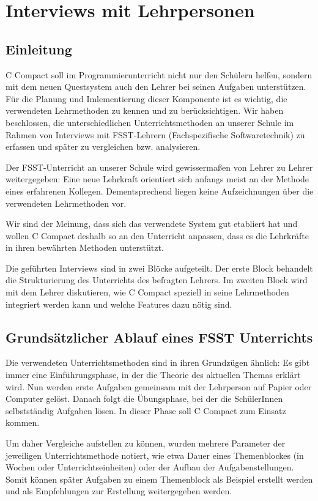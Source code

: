 \section{Interviews mit Lehrpersonen}
\label{sec:sci-interview}

\subsection{Einleitung}
C Compact soll im Programmierunterricht nicht nur den Schülern helfen, sondern mit dem neuen Questsystem auch den Lehrer bei seinen Aufgaben unterstützen. Für die Planung und Imlementierung dieser Komponente ist es wichtig, die verwendeten Lehrmethoden zu kennen und zu berücksichtigen. Wir haben beschlossen, die unterschiedlichen Unterrichtsmethoden an unserer Schule im Rahmen von Interviews mit FSST-Lehrern (Fachspezifische Softwaretechnik) zu erfassen und später zu vergleichen bzw. analysieren. 

Der FSST-Unterricht an unserer Schule wird gewissermaßen von Lehrer zu Lehrer weitergegeben:
Eine neue Lehrkraft orientiert sich anfangs meist an der Methode eines erfahrenen Kollegen. Dementsprechend liegen keine Aufzeichnungen über die verwendeten Lehrmethoden vor. 

Wir sind der Meinung, dass sich das verwendete System gut etabliert hat und wollen C Compact deshalb so an den Unterricht anpassen, dass es die Lehrkräfte in ihren bewährten Methoden unterstützt.

Die geführten Interviews sind in zwei Blöcke aufgeteilt. Der erste Block behandelt die Strukturierung des Unterrichts des befragten Lehrers. Im zweiten Block wird mit dem Lehrer diskutieren, wie C Compact speziell in seine Lehrmethoden integriert werden kann und welche Features dazu nötig sind.

\subsection{Grundsätzlicher Ablauf eines FSST Unterrichts}
Die verwendeten Unterrichtsmethoden sind in ihren Grundzügen ähnlich: Es gibt immer eine Einführungsphase, in der die Theorie des aktuellen Themas erklärt wird. Nun werden erste Aufgaben gemeinsam mit der Lehrperson auf Papier oder Computer gelöst. Danach folgt die Übungsphase, bei der die SchülerInnen selbstständig Aufgaben lösen. In dieser Phase soll C Compact zum Einsatz kommen.

Um daher Vergleiche aufstellen zu können, wurden mehrere Parameter der jeweiligen Unterrichtsmethode notiert, wie etwa Dauer eines Themenblockes (in Wochen oder Unterrichtseinheiten) oder der Aufbau der Aufgabenstellungen. Somit können später Aufgaben zu einem Themenblock als Beispiel erstellt werden und als Empfehlungen zur Erstellung weitergegeben werden.

